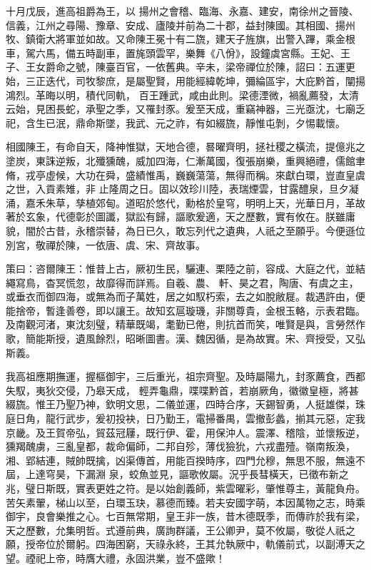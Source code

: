 \begin{pinyinscope}
 十月戊辰，進高祖爵為王，以
 揚州之會稽、臨海、永嘉、建安，南徐州之晉陵、信義，江州之尋陽、豫章、安成、廬陵并前為二十郡，益封陳國。其相國、揚州牧、鎮衛大將軍並如故。又命陳王冕十有二旒，建天子旌旗，出警入蹕，乘金根車，駕六馬，備五時副車，置旄頭雲罕，樂舞《八佾》，設鐘虡宮縣。王妃、王子、王女爵命之號，陳臺百官，一依舊典。辛未，梁帝禪位於陳，詔曰：五運更始，三正迭代，司牧黎庶，是屬聖賢，用能經緯乾坤，彌綸區宇，大庇黔首，闡揚鴻烈。革晦以明，積代同軌，
 百王踵武，咸由此則。梁德湮微，禍亂薦發，太清云始，見困長蛇，承聖之季，又罹封豕。爰至天成，重竊神器，三光亟沈，七廟乏祀，含生已泯，鼎命斯墜，我武、元之祚，有如綴旒，靜惟屯剝，夕惕載懷。



 相國陳王，有命自天，降神惟獄，天地合德，晷曜齊明，拯社稷之橫流，提億兆之塗炭，東誅逆叛，北殲獯醜，威加四海，仁漸萬國，復張崩樂，重興絕禮，儒館聿脩，戎亭虛候，大功在舜，盛績惟禹，巍巍蕩蕩，無得而稱。來獻白環，豈直皇虞之世，入貢素雉，非
 止隆周之日。固以效珍川陸，表瑞煙雲，甘露醴泉，旦夕凝涌，嘉禾朱草，孳植郊甸。道昭於悠代，勳格於皇穹，明明上天，光華日月，革故著於玄象，代德彰於圖讖，獄訟有歸，謳歌爰適，天之歷數，實有攸在。朕雖庸貌，闇於古昔，永稽崇替，為日已久，敢忘列代之遺典，人祇之至願乎。今便遜位別宮，敬禪於陳，一依唐、虞、宋、齊故事。



 策曰：咨爾陳王：惟昔上古，厥初生民，驪連、栗陸之前，容成、大庭之代，並結繩寫鳥，杳冥慌忽，故靡得而詳焉。自羲、農、
 軒、昊之君，陶唐、有虞之主，或垂衣而御四海，或無為而子萬姓，居之如馭朽索，去之如脫敝屣。裁遇許由，便能捨帝，暫逢善卷，即以讓王。故知玄扈璇璣，非關尊貴，金根玉輅，示表君臨。及南觀河渚，東沈刻璧，精華既竭，耄勤已倦，則抗首而笑，唯賢是與，言勞然作歌，簡能斯授，遺風餘烈，昭晰圖書。漢、魏因循，是為故實。宋、齊授受，又弘斯義。



 我高祖應期撫運，握樞御宇，三后重光，祖宗齊聖。及時屬陽九，封豕薦食，西都失馭，夷狄交侵，乃皋天成，
 輕弄龜鼎，喋喋黔首，若崩厥角，徽徽皇極，將甚綴旒。惟王乃聖乃神，欽明文思，二儀並運，四時合序，天錫智勇，人挺雄傑，珠庭日角，龍行武步，爰初投袂，日乃勤王，電掃番禺，雲撤彭蠡，揃其元惡，定我京畿。及王賀帝弘，貿茲冠屨，既行伊、霍，用保沖人。震澤、稽陰，並懷叛逆，獯羯醜虜，三亂皇都，裁命偏師，二邦自殄，薄伐獫狁，六戎盡殪。嶺南叛渙，湘、郢結連，賊帥既擒，凶渠傳首，用能百揆時序，四門允穆，無思不服，無遠不屆，上達穹昊，下漏淵
 泉，蛟魚並見，謳歌攸屬。況乎長彗橫天，已徵布新之兆，璧日斯既，實表更姓之符。是以始創義師，紫雲曜彩，肇惟尊主，黃龍負舟。苦矢素翬，梯山以至，白環玉玦，慕德而臻。若夫安國字萌，本因萬物之志，時乘御宇，良會樂推之心。七百無常期，皇王非一族，昔木德既季，而傳祚於我有梁，天之歷數，允集明哲。式遵前典，廣詢群議，王公卿尹，莫不攸屬，敬從人祇之願，授帝位於爾躬。四海困窮，天祿永終，王其允執厥中，軌儀前式，以副溥天之
 望。禋祀上帝，時膺大禮，永固洪業，豈不盛歟！




\end{pinyinscope}
